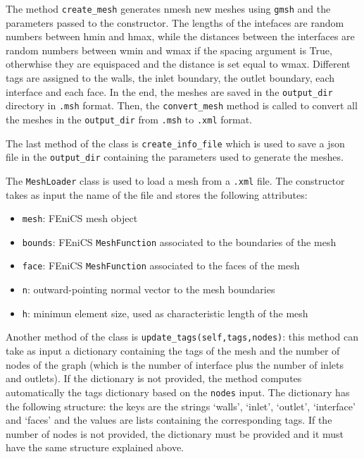 \documentclass[11pt,a4paper]{article}
\begin{document}
The method \texttt{create\_mesh} generates nmesh new meshes using \texttt{gmsh} and the parameters passed to the constructor. The lengths of the intefaces are random numbers between hmin and hmax, while the distances between the interfaces are random numbers between wmin and wmax if the spacing argument is True, otherwhise they are equispaced and the distance is set equal to wmax. Different tags are assigned to the walls, the inlet boundary, the outlet boundary, each interface and each face. In the end, the meshes are saved in the \texttt{output\_dir} directory in \texttt{.msh} format.
Then, the \texttt{convert\_mesh} method is called to convert all the meshes in the \texttt{output\_dir} from \texttt{.msh} to \texttt{.xml} format. 

The last method of the class is \texttt{create\_info\_file} which is used to save a json file in the \texttt{output\_dir} containing the parameters used to generate the meshes.

The \texttt{MeshLoader} class is used to load a mesh from a \texttt{.xml} file. The constructor takes as input the name of the file and stores the following attributes:
\begin{itemize}
    \item \texttt{mesh}: FEniCS mesh object
    \item \texttt{bounds}: FEniCS \texttt{MeshFunction} associated to the boundaries of the mesh
    \item \texttt{face}: FEniCS \texttt{MeshFunction} associated to the faces of the mesh
    \item \texttt{n}: outward-pointing normal vector to the mesh boundaries
    \item \texttt{h}: minimun element size, used as characteristic length of the mesh
\end{itemize}

Another method of the class is \texttt{update\_tags(self,tags,nodes)}: this method can take as input a dictionary containing the tags of the mesh and the number of nodes of the graph (which is the number of interface plus the number of inlets and outlets). If the dictionary is not provided, the method computes automatically the tags dictionary based on the \texttt{nodes} input. The dictionary has the following structure: the keys are the strings `walls', `inlet', `outlet', `interface' and `faces' and the values are lists containing the corresponding tags. %
If the number of nodes is not provided, the dictionary must be provided and it must have the same structure explained above.
\end{document}
